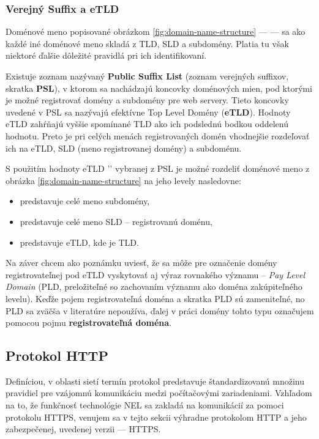 \subsubsection{Verejný Suffix a eTLD}

Doménové meno popisované obrázkom \ref{fig:domain-name-structure} ---  --- sa ako každé iné doménové meno skladá z TLD, SLD a subdomény. 
Platia tu však niektoré ďalšie dôležité pravidlá pri ich identifikovaní.

Existuje zoznam nazývaný \textbf{Public Suffix List} (zoznam verejných suffixov, skratka \textbf{PSL}), v ktorom sa nachádzajú koncovky doménových mien, pod ktorými je možné registrovať domény a subdomény pre web servery.
Tieto koncovky uvedené v PSL sa nazývajú efektívne Top Level Domény (\textbf{eTLD}).
Hodnoty eTLD zahŕňajú vyššie spomínané TLD ako ich podslednú bodkou oddelenú hodnotu.
Preto je pri celých menách registrovaných domén vhodnejšie rozdeľovať ich na eTLD, SLD (meno registrovanej domény) a subdoménu.

S použitím hodnoty eTLD '' vybranej z PSL je možné rozdeliť doménové meno z obrázka \ref{fig:domain-name-structure} na jeho levely nasledovne: 
\begin{itemize}
    \item {} predstavuje celé meno subdomény,
    \item {} predstavuje celé meno SLD -- registrovanú doménu,
    \item {} predstavuje eTLD, kde  je TLD.
\end{itemize}


Na záver chcem ako poznámku uviesť, že sa môže pre označenie domény registrovateľnej pod eTLD vyskytovať aj výraz rovnakého významu -- \textit{Pay Level Domain} (PLD, preložiteľné so zachovaním významu ako doména zakúpiteľného levelu).
Keďže pojem registrovateľná doména a skratka PLD sú zameniteľné, no PLD sa zväčša v literatúre nepoužíva, 
ďalej v práci domény tohto typu označujem pomocou pojmu \textbf{registrovateľná doména}.

\subsection{Protokol HTTP}
\label{protokol-http}
Definíciou, v oblasti sietí termín protokol predstavuje štandardizovanú množinu pravidiel pre vzájomnú komunikáciu medzi počítačovými zariadeniami. %
Vzhľadom na to, že funkčnosť technológie NEL sa zakladá na komunikácií za pomoci protokolu HTTPS, %
venujem sa v tejto sekcii výhradne protokolom HTTP a jeho zabezpečenej, uvedenej verzii --- HTTPS. 


